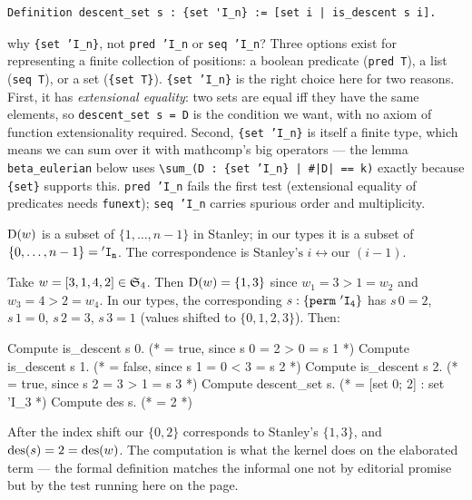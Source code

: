 \begin{lstlisting}[language=Rocq]
Definition descent_set s : {set 'I_n} := [set i | is_descent s i].
\end{lstlisting}


\begin{sidebar}{why \texttt{\{set 'I\_n\}}, not \texttt{pred 'I\_n} or \texttt{seq 'I\_n}?}
Three options exist for representing a finite collection of
positions: a boolean predicate (\texttt{pred T}), a list
(\texttt{seq T}), or a set (\texttt{\{set T\}}).
\texttt{\{set\,'I\_n\}} is the right choice here for two reasons.
First, it has \emph{extensional equality}: two sets are equal iff
they have the same elements, so \texttt{descent\_set s = D} is the
condition we want, with no axiom of function extensionality
required. Second, \texttt{\{set 'I\_n\}} is itself a finite type,
which means we can sum over it with mathcomp's big operators ---
the lemma \texttt{beta\_eulerian} below uses
\texttt{\textbackslash sum\_(D : \{set 'I\_n\}\,|\,\#|D|\,==\,k)}
exactly because \texttt{\{set\}} supports this.
\texttt{pred 'I\_n} fails the first test (extensional equality of
predicates needs \texttt{funext}); \texttt{seq 'I\_n} carries
spurious order and multiplicity.
\end{sidebar}

\noindent
$\mathrm{D}(w)$ is a subset of $\{1, \dots, n-1\}$ in Stanley; in our
types it is a subset of $\{0, \dots, n-1\} = \mathtt{'I_{n}}$. The
correspondence is $\text{Stanley's } i \leftrightarrow \text{our } (i-1)$.

\begin{example}[{Stanley's $w = [3,1,4,2]$, both ways}]
  \label{ex:s3142}
  Take $w = [3, 1, 4, 2] \in \mathfrak{S}_{4}$. Then
  $\mathrm{D}(w) = \{1, 3\}$ since $w_1 = 3 > 1 = w_2$ and
  $w_3 = 4 > 2 = w_4$. In our types, the corresponding
  $s : \mathtt{\{perm\ \mathtt{'I_{4}}\}}$ has $s\,0 = 2$, $s\,1 = 0$, $s\,2 = 3$,
  $s\,3 = 1$ (values shifted to $\{0,1,2,3\}$). Then:
  \begin{computestrip}
Compute is_descent s 0.    (* = true, since s 0 = 2 > 0 = s 1 *)
Compute is_descent s 1.    (* = false, since s 1 = 0 < 3 = s 2 *)
Compute is_descent s 2.    (* = true, since s 2 = 3 > 1 = s 3 *)
Compute descent_set s.     (* = [set 0; 2] : {set 'I_3} *)
Compute des s.             (* = 2 *)
  \end{computestrip}
  \noindent After the index shift our $\{0, 2\}$ corresponds to
  Stanley's $\{1, 3\}$, and $\mathrm{des}(s) = 2 = \mathrm{des}(w)$. The
  computation is what the kernel does on the elaborated term ---
  the formal definition matches the informal one not by editorial
  promise but by the test running here on the page.
\end{example}

